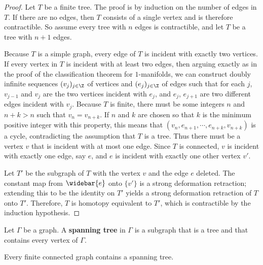 \begin{proof}
Let $T$ be a finite tree. The proof is by induction on the number of edges in $T$. If there are no edges, then $T$ consists of a single vertex and is therefore contractible.
So assume every tree with $n$ edges is contractible, and let $T$ be a tree with $n+1$
edges.\par
Because $T$ is a simple graph, every edge of $T$ is incident with exactly two vertices.
If every vertex in $T$ is incident with at least two edges, then arguing exactly as in the proof of the classification theorem for $1$-manifolds, we can construct doubly infinite sequences $(v_j)_{j\in\Z}$ of vertices and $(e_j)_{j\in\Z}$ of edges such that for each $j$, $v_{j-1}$ and $v_j$ are the two vertices incident with $e_j$, and $e_j$, $e_{j+1}$ are two different edges incident with $v_j$. Because $T$ is finite, there must be some integers $n$ and $n+k>n$ such that $v_n=v_{n+k}$. If $n$ and $k$ are chosen so that $k$ is the minimum positive integer with this property, this means that $(v_n,e_{n+1},\cdots,e_{n+k},v_{n+k})$ is a cycle, contradicting the assumption that $T$ is a tree. Thus there must be a vertex $v$ that is incident with at most one edge. Since $T$ is connected, $v$ is incident with exactly one edge, say $e$, and $e$ is incident with exactly one other vertex $v'$.\par 
Let $T'$ be the subgraph of $T$ with the vertex $v$ and the edge $e$ deleted. The constant map from $\widebar{e}$ onto $\{v'\}$ is a strong deformation retraction; extending this to be the identity on $T'$ yields a strong deformation retraction of $T$ onto $T'$. Therefore, $T$ is homotopy equivalent to $T'$, which is contractible by the induction hypothesis.
\end{proof}
Let $\Gamma$ be a graph. A \textbf{spanning tree} in $\Gamma$ is a subgraph that is a tree and that contains every vertex of $\Gamma$.
\begin{proposition}
Every finite connected graph contains a spanning tree.
\end{proposition}
